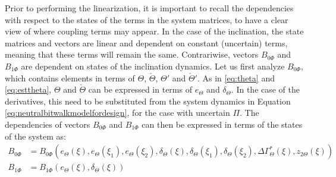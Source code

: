 \documentclass[../main.tex]{subfiles}
\begin{document}
Prior to performing the linearization, it is important to recall the dependencies with respect to the states of the terms in the system matrices, to have a clear view of where coupling terms may appear. In the case of the inclination, the state matrices and vectors are linear and dependent on constant (uncertain) terms, meaning that these terms will remain the same. Contrariwise, vectors $B_{0\Phi}$ and $B_{1\Phi}$ are dependent on states of the inclination dynamics. Let us first analyze $B_{0\Phi}$, which contains elements in terms of $\Theta$, $\check{\Theta}$, $\Theta'$ and $\check{\Theta}'$. As in \eqref{eq:theta} and \eqref{eq:esttheta}, $\Theta$ and $\check{\Theta}$ can be expressed in terms of $e_\Theta$ and $\delta_\Theta$. In the case of the derivatives, this need to be substituted from the system dynamics in Equation \eqref{eq:neutralbitwalkmodelfordesign}, for the case with uncertain $\Pi$. The dependencies of vectors $B_{0\Phi}$ and $B_{1\Phi}$ can then be expressed in terms of the states of the system as:
\begin{align}
	B_{0\Phi} &= B_{0\Phi} (e_\Theta(\xi),e_\Theta(\xi_1),e_\Theta(\xi_2),\delta_\Theta(\xi),\delta_\Theta(\xi_1),\delta_\Theta(\xi_2),\Delta \Gamma_\Theta^*(\xi),z_{2\Theta}(\xi)) \nonumber \\
	B_{1\Phi} &= B_{1\Phi}(e_\Theta(\xi),\delta_\Theta(\xi))
\end{align}
\end{document}
